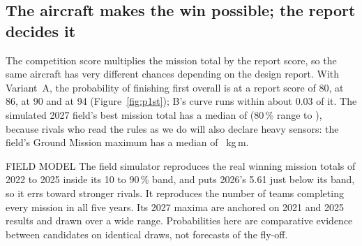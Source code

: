 \subsection{The aircraft makes the win possible; the report decides it}
The competition score multiplies the mission total by the report score, so the same aircraft has very different chances depending on the design report. With Variant~A, the probability of finishing first overall is  at a report score of 80,  at 86,  at 90 and  at 94 (Figure~\ref{fig:p1st}); B's curve runs within about 0.03 of it. The simulated 2027 field's best mission total has a median of  (80\,\% range  to ), because rivals who read the rules as we do will also declare heavy sensors: the field's Ground Mission maximum has a median of ~kg\,m.


\begin{qualitybox}{FIELD MODEL}
The field simulator reproduces the real winning mission totals of 2022 to 2025 inside its 10 to 90\,\% band, and puts 2026's 5.61 just below its band, so it errs toward stronger rivals. It reproduces the number of teams completing every mission in all five years. Its 2027 maxima are anchored on 2021 and 2025 results and drawn over a wide range. Probabilities here are comparative evidence between candidates on identical draws, not forecasts of the fly-off.
\end{qualitybox}

